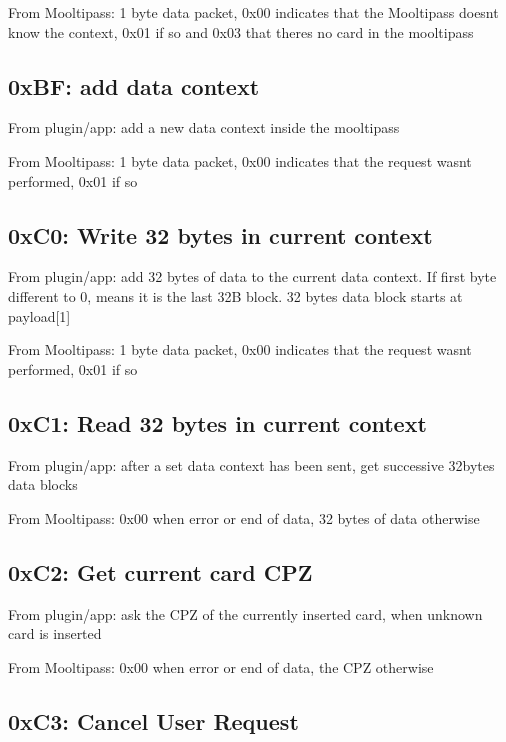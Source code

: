 From Mooltipass\+: 1 byte data packet, 0x00 indicates that the Mooltipass doesn\textquotesingle{}t know the context, 0x01 if so and 0x03 that there\textquotesingle{}s no card in the mooltipass

\subsection*{0x\+BF\+: add data context }

From plugin/app\+: add a new data context inside the mooltipass

From Mooltipass\+: 1 byte data packet, 0x00 indicates that the request wasn\textquotesingle{}t performed, 0x01 if so

\subsection*{0x\+C0\+: Write 32 bytes in current context }

From plugin/app\+: add 32 bytes of data to the current data context. If first byte different to 0, means it is the last 32B block. 32 bytes data block starts at payload\mbox{[}1\mbox{]}

From Mooltipass\+: 1 byte data packet, 0x00 indicates that the request wasn\textquotesingle{}t performed, 0x01 if so

\subsection*{0x\+C1\+: Read 32 bytes in current context }

From plugin/app\+: after a set data context has been sent, get successive 32bytes data blocks

From Mooltipass\+: 0x00 when error or end of data, 32 bytes of data otherwise

\subsection*{0x\+C2\+: Get current card C\+PZ }

From plugin/app\+: ask the C\+PZ of the currently inserted card, when unknown card is inserted

From Mooltipass\+: 0x00 when error or end of data, the C\+PZ otherwise

\subsection*{0x\+C3\+: Cancel User Request }

